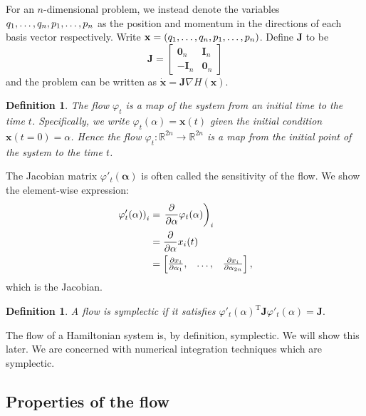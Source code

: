 \documentclass{report}
\theoremstyle{exampstyle} \newtheorem{example}[theorem]{Example}
\theoremstyle{exampstyle} \newtheorem{remark}[theorem]{Remark}
\theoremstyle{exampstyle} \newtheorem{definition}[theorem]{Definition}
\theoremstyle{exampstyle} \newtheorem{lemma}[theorem]{Lemma}
\begin{document}
For an $n$-dimensional problem,
we instead denote the variables $q_1, \mathellipsis, q_n, p_1, \mathellipsis, p_n$ as the position and momentum in the directions of each basis vector respectively.
Write $\mathbf{x} = (q_1, \mathellipsis, q_n, p_1, \mathellipsis, p_n)$.
Define $\mathbf{J}$ to be
\begin{equation}
	\mathbf{J} = \begin{bmatrix}
		\mathbf{0}_n & \mathbf{I}_n \\
		-\mathbf{I}_n & \mathbf{0}_n
	\end{bmatrix}
\end{equation}
and the problem can be written as $\mathbf{\dot{x}} = \mathbf{J}\nabla H(\mathbf{x})$.

\begin{definition}
	The flow $\varphi_t$ is a map of the system from an initial time to the time $t$.
	Specifically, we write $\varphi_t(\alpha) = \mathbf{x}(t)$ given the initial condition $\mathbf{x}(t=0) = \alpha$. Hence the flow $\varphi_t:\mathds{R}^{2n}\rightarrow \mathds{R}^{2n}$ is a map from the initial point of the system to the time $t$.
\end{definition}
The Jacobian matrix $\varphi'_t(\mathbf{\alpha})$ is often called the sensitivity of the flow.
We show the element-wise expression:
\begin{align*}
	\left. \varphi'_t(\alpha) \right)_i &= \left. \frac{\partial}{\partial \alpha} \varphi_t(\alpha) \right)_i \\
	&= \frac{\partial}{\partial \alpha} x_i(t) \\
	&= \begin{bmatrix}
		\frac{\partial x_i}{\partial \alpha_1}, & \mathellipsis, & \frac{\partial x_i}{\partial \alpha_{2n}}
	\end{bmatrix},
\end{align*}
which is the Jacobian.
\begin{definition}
	A flow is symplectic if it satisfies $\varphi'_t(\alpha)^\mathrm{T} \mathbf{J} \varphi'_t(\alpha) = \mathbf{J}.$
\end{definition}
The flow of a Hamiltonian system is, by definition, symplectic. We will show this later.
We are concerned with numerical integration techniques which are symplectic.

\subsection{Properties of the flow}
\end{document}
